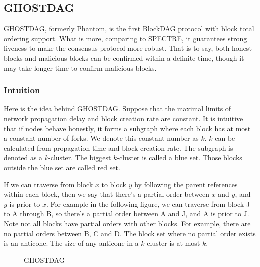 \documentclass[a4paper,11pt]{article}
\begin{document}
\subsection{GHOSTDAG}

GHOSTDAG, formerly Phantom, is the first BlockDAG protocol with block total ordering support. What is more, comparing to SPECTRE, it guarantees strong liveness to make the consensus protocol more robust. That is to say, both honest blocks and malicious blocks can be confirmed within a definite time, though it may take longer time to confirm malicious blocks.


\subsubsection{Intuition}

Here is the idea behind GHOSTDAG. Suppose that the maximal limits of network propagation delay and block creation
rate are constant. It is intuitive that if nodes behave honestly, it forms a subgraph where each block has at most a constant number of forks. We denote
this constant number as $k$. $k$ can be calculated from propagation time and
block creation rate. The subgraph is denoted as a $k$-cluster. The biggest
$k$-cluster is called a blue set. Those blocks outside the blue set are called
red set.

If we can traverse from block $x$ to block $y$ by following the parent
references within each block, then we say that there's a partial order between
$x$ and $y$, and $y$ is prior to $x$. For example in the following figure, we
can traverse from block J to A through B, so there's a partial order between A
and J, and A is prior to J. Note not all blocks have partial orders with other
blocks. For example, there are no partial orders between B, C and D.  The block set where no partial order exists is an anticone. The size of any anticone in
a $k$-cluster is at most $k$.

\begin{figure}[ht]
	\centerline{%
	}
\caption{GHOSTDAG}
\end{figure}
\end{document}
